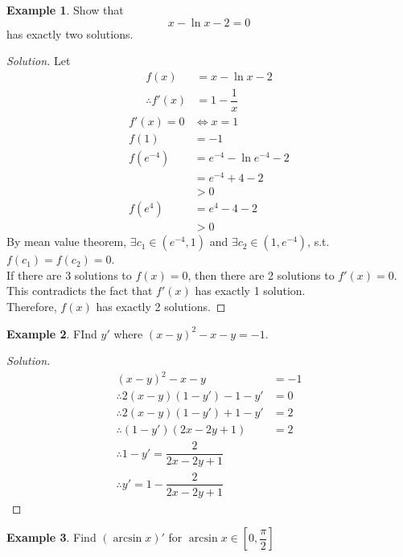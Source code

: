 \documentclass[fleqn]{article}
\theoremstyle{definition}
\newtheorem{example}{Example}
\theoremstyle{theorem}
\newenvironment{solution}
{\begin{proof}[Solution]\let\qed\relax}
	{\end{proof}}
\begin{document}
\begin{example}
	Show that
	\begin{equation*}
		x - \ln x - 2 = 0
	\end{equation*}
	has exactly two solutions.
\end{example}

\begin{solution}
	Let 
	\begin{align*}
		f(x) &= x - \ln x - 2 \\
		\therefore f'(x) &= 1 - \dfrac{1}{x}
	\end{align*}
	\begin{align*}
	f'(x) = 0 &\Leftrightarrow x = 1 \\
	f(1) &= -1 \\
	f(e^{-4}) &= e^{-4} - \ln e^{-4} - 2 \\
	&= e^{-4} + 4 -2 \\
	&> 0 \\
	f(e^4) &= e^4 - 4 -2 \\
	&> 0 
	\end{align*}
	By mean value theorem, $\exists c_1 \in (e^{-4}, 1)$ and $\exists c_2 \in (1, e^{-4})$, s.t. $f(c_1) = f(c_2) = 0$.\\
	If there are 3 solutions to $f(x) = 0$, then there are 2 solutions to $f'(x) = 0$. This contradicts the fact that $f'(x)$ has exactly 1 solution.\\
	Therefore, $f(x)$ has exactly 2 solutions.
\end{solution}

\begin{example}
	FInd $y'$ where $(x-y)^2 - x - y = -1$.
\end{example}

\begin{solution}
	\begin{align*}
		(x-y)^2 - x - y &= -1 \\
		\therefore 2(x-y)(1 - y') - 1 - y' &= 0 \\
		\therefore 2(x-y)(1 - y') + 1 - y' &= 2 \\
		\therefore (1 - y')(2x - 2y + 1) &= 2 \\
		\therefore 1 - y' = \dfrac{2}{2x - 2y + 1} \\
		\therefore y' = 1 - \dfrac{2}{2x - 2y + 1} 
	\end{align*}
\end{solution}

\begin{example}
	Find $(\arcsin x)'$ for $\arcsin x \in \left[0, \dfrac{\pi}{2}\right]$
\end{example}
\end{document}
